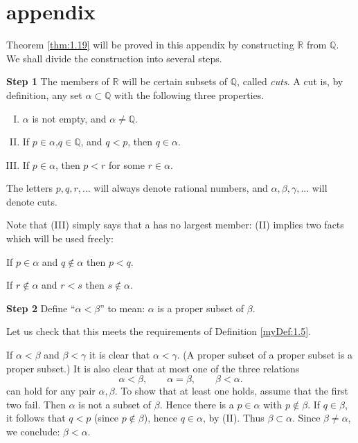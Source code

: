 \section*{appendix}
Theorem \ref{thm:1.19} will be proved in this appendix by constructing $\mathbb{R}$ from $\mathbb{Q}$. 
We shall divide the construction into several steps.

\textbf{Step 1} 
The members of $\mathbb{R}$ will be certain subsets of $\mathbb{Q}$, called \emph{cuts}. 
A cut is, by definition, any set $\alpha \subset \mathbb{Q}$ with the following three properties.
\begin{enumerate}[(I)]
    \item $\alpha$ is not empty, and $\alpha \neq \mathbb{Q}$.
    \item If $p\in \alpha$,$q \in \mathbb{Q}$, and $q <p$, then $q \in \alpha$.
    \item If $p \in \alpha$, then $p <r$ for some $r\in \alpha$.
\end{enumerate}


The letters $p, q, r, ...$ will always denote rational numbers, and $\alpha, \beta, \gamma, ...$
will denote cuts.


Note that (III) simply says that a has no largest member: (II) implies two facts which will be used freely:

If $p\in\alpha$ and $q\not\in\alpha$ then $p<q$.

If $r\not\in \alpha$ and $r<s$ then $s\not\in \alpha$.

\textbf{Step 2}
Define ``$\alpha < \beta$'' to mean: $\alpha$ is a proper subset of $\beta$.

Let us check that this meets the requirements of Definition \ref{myDef:1.5}.

If $\alpha < \beta$ and $\beta < \gamma$ it is clear that $\alpha < \gamma$. (A proper subset of a proper subset is a proper subset.) It is also clear that at most one of the three relations
\begin{equation*}
    \alpha < \beta, \qquad
    \alpha = \beta, \qquad
    \beta < \alpha.
\end{equation*}
can hold for any pair $\alpha, \beta$. To show that at least one holds, assume that the first two fail. Then $\alpha$ is not a subset of $\beta$. Hence there is a $p \in \alpha$ with $p \not\in \beta$. If $q \in \beta$, it follows that $q <p$ (since $p \not\in \beta$), hence $q \in \alpha$, by (II). Thus $\beta \subset \alpha$. Since $\beta \neq \alpha$, we conclude: $\beta < \alpha$.

